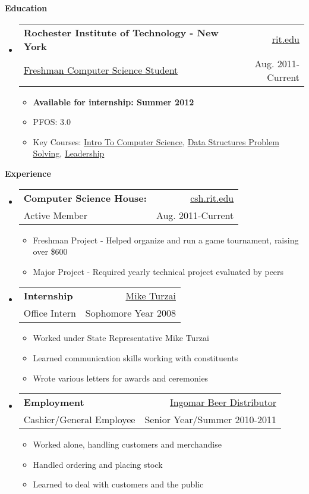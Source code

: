 \documentclass[letterpaper,11pt]{article}
\makeatletter
\newcommand{\resitem}[1]{\item #1 \vspace{-2pt}}
\newcommand{\resheading}[1]{{\large \colorbox{mygrey}{\begin{minipage}{\textwidth}{\textbf{#1 \vphantom{p\^{E}}}}\end{minipage}}}}
\newcommand{\ressubheading}[4]{
\begin{tabular*}{6.5in}{l@{\extracolsep{\fill}}r}
		\textbf{#1} & #2 \\
		{#3} & {#4} \\
\end{tabular*}\vspace{-6pt}}
\makeatother
\begin{document}
\resheading{Education}
	{ \footnotesize
	\begin{itemize}
		\item
			\ressubheading{Rochester Institute of Technology - New York}{\href{http://www.rit.edu/}{rit.edu}}{\href{http://www.cs.rit.edu/}{Freshman Computer Science Student}}{Aug. 2011-Current}
				{ \footnotesize
				\begin{itemize}
					\resitem{\textbf{Available for internship: Summer 2012}}
					\resitem{PFOS: 3.0}
					\resitem{Key Courses: \href{https://register.rit.edu/courseSchedule/20111/40/03/241/05}{Intro To Computer Science}, \href{https://register.rit.edu/courseSchedule/20112/40/03/242/05}{Data Structures Problem Solving}, \href{https://register.rit.edu/courseSchedule/20112/17/20/053/03}{Leadership}}
				\end{itemize}
				}
	\end{itemize} %
	}
\resheading{Experience}
{\footnotesize
	\begin{itemize}
		\item 
			\ressubheading{Computer Science House:}{\href{http://www.csh.rit.edu/}{csh.rit.edu}}{Active Member}{Aug. 2011-Current} 
			{ \footnotesize
				\begin{itemize}		
					\resitem{{Freshman Project} - Helped organize and run a game tournament, raising over \$600} 
					\resitem{{Major Project} - Required yearly technical project evaluated by peers}
				\end{itemize}
			}
		\item	
			\ressubheading{Internship}{\href{http://www.repturzai.com/}{Mike Turzai}}{Office Intern}{Sophomore Year 2008} 
				{ \footnotesize 
				\begin{itemize}
					\item{Worked under State Representative Mike Turzai}
					\item{Learned communication skills working with constituents}
					\item{Wrote various letters for awards and ceremonies}
				\end{itemize}
				}
		\item 
			\ressubheading{Employment}{\href{https://www.facebook.com/pages/Ingomar-Beer-Distributor/120207034680524}{Ingomar Beer Distributor}}{Cashier/General Employee}{Senior Year/Summer 2010-2011}
			{ \footnotesize
				\begin{itemize}
					\item{Worked alone, handling customers and merchandise}
					\item{Handled ordering and placing stock}
					\item{Learned to deal with customers and the public}
				\end{itemize}
			}
		
	\end{itemize}  %
}
\end{document}

